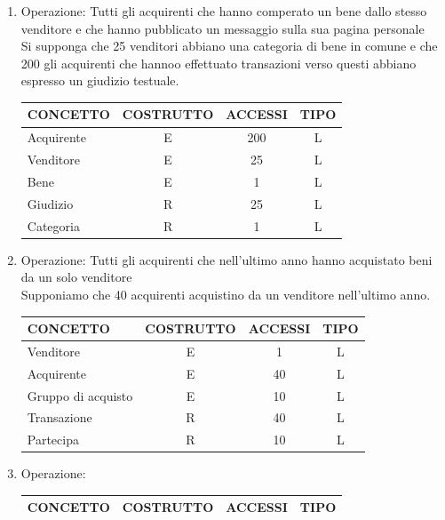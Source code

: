 \documentclass[a4paper, 10pt]{report}
\begin{document}
\begin{enumerate}
\item Operazione: Tutti gli acquirenti che hanno comperato un bene dallo stesso venditore e che hanno pubblicato un messaggio sulla sua pagina personale\\
Si supponga che 25 venditori abbiano una categoria di bene in comune e che 200 gli acquirenti che hannoo effettuato transazioni verso questi abbiano espresso un giudizio testuale.
\begin{table}[h!]
\centering
\begin{tabular}{|l|c|c|c|}
\hline
\textbf{CONCETTO}&\textbf{COSTRUTTO}&\textbf{ACCESSI}&\textbf{TIPO}\\
\hline
Acquirente & E & 200 & L\\
\hline
Venditore & E & 25 & L\\
\hline
Bene & E & 1 & L\\
\hline
Giudizio & R & 25 & L\\
\hline
Categoria & R & 1 & L\\
\hline
\end{tabular}
\end{table}

\item Operazione: Tutti gli acquirenti che nell'ultimo anno hanno acquistato beni da un solo venditore\\
Supponiamo che 40 acquirenti acquistino da un venditore nell'ultimo anno.
\begin{table}[h!]
\centering
\begin{tabular}{|l|c|c|c|}
\hline
\textbf{CONCETTO}&\textbf{COSTRUTTO}&\textbf{ACCESSI}&\textbf{TIPO}\\
\hline
Venditore & E & 1 & L\\ 
\hline
Acquirente & E & 40 & L\\
\hline
Gruppo di acquisto & E & 10 & L\\
\hline
Transazione & R & 40 & L\\
\hline
Partecipa & R & 10 & L\\
\hline
\end{tabular}
\end{table}
\newpage 
\item Operazione: \\
\begin{table}[h!]
\centering
\begin{tabular}{|l|c|c|c|}
\hline
\textbf{CONCETTO}&\textbf{COSTRUTTO}&\textbf{ACCESSI}&\textbf{TIPO}\\
\hline
\end{tabular}
\end{table}


\end{enumerate}
\end{document}
